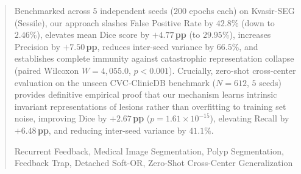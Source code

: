 \documentclass[journal, 10pt]{IEEEtran}
\begin{document}
\begin{abstract}
Benchmarked across 5 independent seeds ($200$ epochs each) on Kvasir-SEG
(Sessile), our approach slashes False Positive Rate by \textbf{$42.8\%$}
(down to $2.46\%$), elevates mean Dice score by \textbf{$+4.77$\,pp}
(to $29.95\%$), increases Precision by \textbf{$+7.50$\,pp}, reduces
inter-seed variance by \textbf{$66.5\%$}, and establishes complete immunity
against catastrophic representation collapse
(paired Wilcoxon $W = 4{,}055.0$, $p < 0.001$). Crucially, zero-shot cross-center evaluation on the unseen CVC-ClinicDB
benchmark ($N = 612$, $5$ seeds) provides definitive empirical proof that our
mechanism learns intrinsic invariant representations of lesions rather than
overfitting to training set noise, improving Dice by \textbf{$+2.67$\,pp}
($p = 1.61 \times 10^{-15}$), elevating Recall by \textbf{$+6.48$\,pp}, and
reducing inter-seed variance by $41.1\%$.

\begin{IEEEkeywords}
  Recurrent Feedback, Medical Image Segmentation, Polyp Segmentation,
  Feedback Trap, Detached Soft-OR, Zero-Shot Cross-Center Generalization
\end{IEEEkeywords}
\end{abstract}









\end{document}
